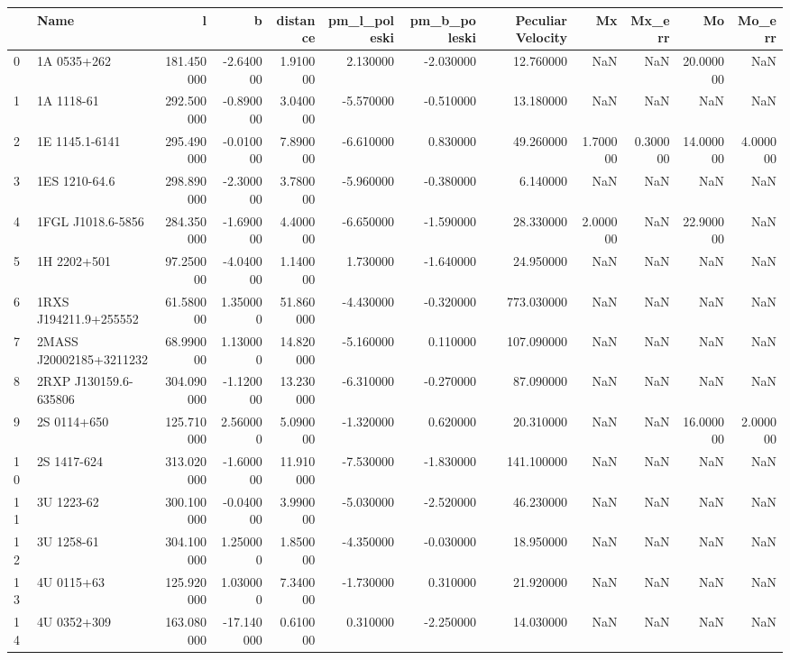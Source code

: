 \begin{tabular}{llrrrrrrrrrr}
\toprule
 & Name & l & b & distance & pm_l_poleski & pm_b_poleski & Peculiar Velocity & Mx & Mx_err & Mo & Mo_err \\
\midrule
0 & 1A 0535+262 & 181.450000 & -2.640000 & 1.910000 & 2.130000 & -2.030000 & 12.760000 & NaN & NaN & 20.000000 & NaN \\
1 & 1A 1118-61 & 292.500000 & -0.890000 & 3.040000 & -5.570000 & -0.510000 & 13.180000 & NaN & NaN & NaN & NaN \\
2 & 1E 1145.1-6141 & 295.490000 & -0.010000 & 7.890000 & -6.610000 & 0.830000 & 49.260000 & 1.700000 & 0.300000 & 14.000000 & 4.000000 \\
3 & 1ES 1210-64.6 & 298.890000 & -2.300000 & 3.780000 & -5.960000 & -0.380000 & 6.140000 & NaN & NaN & NaN & NaN \\
4 & 1FGL J1018.6-5856 & 284.350000 & -1.690000 & 4.400000 & -6.650000 & -1.590000 & 28.330000 & 2.000000 & NaN & 22.900000 & NaN \\
5 & 1H 2202+501 & 97.250000 & -4.040000 & 1.140000 & 1.730000 & -1.640000 & 24.950000 & NaN & NaN & NaN & NaN \\
6 & 1RXS J194211.9+255552 & 61.580000 & 1.350000 & 51.860000 & -4.430000 & -0.320000 & 773.030000 & NaN & NaN & NaN & NaN \\
7 & 2MASS J20002185+3211232 & 68.990000 & 1.130000 & 14.820000 & -5.160000 & 0.110000 & 107.090000 & NaN & NaN & NaN & NaN \\
8 & 2RXP J130159.6-635806 & 304.090000 & -1.120000 & 13.230000 & -6.310000 & -0.270000 & 87.090000 & NaN & NaN & NaN & NaN \\
9 & 2S 0114+650 & 125.710000 & 2.560000 & 5.090000 & -1.320000 & 0.620000 & 20.310000 & NaN & NaN & 16.000000 & 2.000000 \\
10 & 2S 1417-624 & 313.020000 & -1.600000 & 11.910000 & -7.530000 & -1.830000 & 141.100000 & NaN & NaN & NaN & NaN \\
11 & 3U 1223-62 & 300.100000 & -0.040000 & 3.990000 & -5.030000 & -2.520000 & 46.230000 & NaN & NaN & NaN & NaN \\
12 & 3U 1258-61 & 304.100000 & 1.250000 & 1.850000 & -4.350000 & -0.030000 & 18.950000 & NaN & NaN & NaN & NaN \\
13 & 4U 0115+63 & 125.920000 & 1.030000 & 7.340000 & -1.730000 & 0.310000 & 21.920000 & NaN & NaN & NaN & NaN \\
14 & 4U 0352+309 & 163.080000 & -17.140000 & 0.610000 & 0.310000 & -2.250000 & 14.030000 & NaN & NaN & NaN & NaN \\

\end{tabular}
